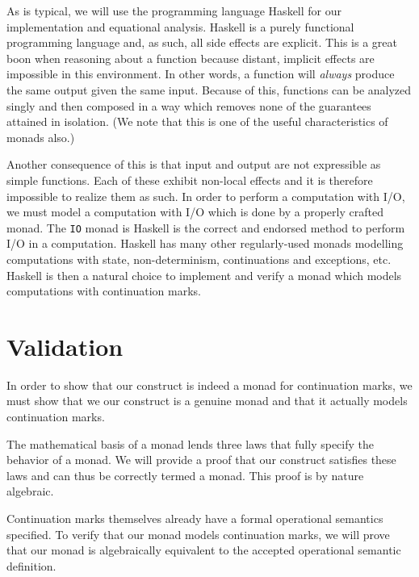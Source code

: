 \documentclass[ms]{byuprop}
\newcounter{definition}
\begin{document}
As is typical, we will use the programming language Haskell \cite{jones2003haskell} for
our implementation and equational analysis. Haskell is a purely functional programming
language and, as such, all side effects are explicit. This is a great boon when reasoning
about a function because distant, implicit effects are impossible in this environment. In
other words, a function will \emph{always} produce the same output given the same input.
Because of this, functions can be analyzed singly and then composed in a way which removes
none of the guarantees attained in isolation. (We note that this is one of the useful
characteristics of monads also.)


Another consequence of this is that input and output are not expressible as simple
functions. Each of these exhibit non-local effects and it is therefore impossible to
realize them as such. In order to perform a computation with I/O, we must model a
computation with I/O which is done by a properly crafted monad. The \texttt{IO} monad is
Haskell is the correct and endorsed method to perform I/O in a computation. Haskell has
many other regularly-used monads modelling computations with state, non-determinism,
continuations and exceptions, etc. Haskell is then a natural choice to implement and
verify a monad which models computations with continuation marks.

\section{Validation}


In order to show that our construct is indeed a monad for continuation marks, we must show
that we our construct is a genuine monad and that it actually models continuation marks.

The mathematical basis of a monad lends three laws that fully specify the behavior of a 
monad. We will provide a proof that our construct satisfies these laws and can thus be 
correctly termed a monad. This proof is by nature algebraic.

Continuation marks themselves already have a formal operational semantics specified. To 
verify that our monad models continuation marks, we will prove that our monad is 
algebraically equivalent to the accepted operational semantic definition.
\end{document}
